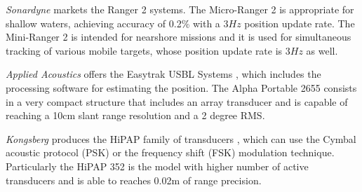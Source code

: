 \textit{Sonardyne} markets the Ranger 2 systems. The Micro-Ranger 2 \cite{sonardyne1} is appropriate for shallow waters, achieving accuracy of 0.2\% with a $3Hz$ position update rate. The Mini-Ranger 2 \cite{sonardyne2} is intended for nearshore missions and it is  used for simultaneous tracking of various mobile targets, whose position update rate is $3Hz$ as well.

\textit{Applied Acoustics} offers the Easytrak USBL Systems \cite{applied-easytrak}, which includes the processing software for estimating the position. The Alpha Portable 2655 consists in a very compact structure that includes an array transducer and is capable of reaching a 10cm slant range resolution and a 2 degree RMS.

\textit{Kongsberg} produces the HiPAP family of transducers \cite{hipap_hardw}, which can use the Cymbal acoustic protocol (PSK) or the frequency shift (FSK) modulation technique. Particularly the HiPAP 352 is the model with higher number of active transducers and is able to reaches 0.02m of range precision.

